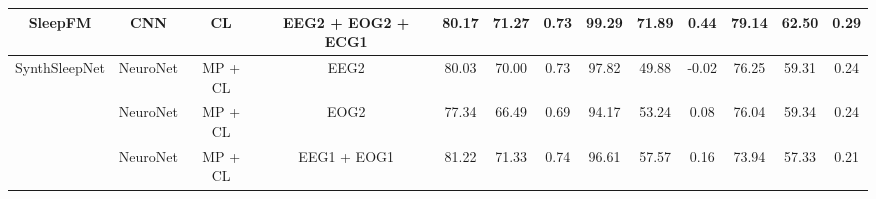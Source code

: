 \begin{table*}[!htbp]
{{\begin{tabular}{c|c|c|c|ccc|ccc|ccc}
SleepFM \cite{ref23}                                                                               & CNN                                                                                               & CL                                                                                                      & EEG2 + EOG2 + ECG1                  & 80.17          & 71.27          & 0.73                                                                     & 99.29          & 71.89          & 0.44                                                          & 79.14          & 62.50          & 0.29                                                              \\ 
\hline
\multirow{9}{*}{SynthSleepNet}                                                         & NeuroNet                                                                                          & MP
  + CL                                                                                               & EEG2                                & 80.03          & 70.00          & 0.73                                                                     & 97.82          & 49.88          & -0.02                                                         & 76.25          & 59.31          & 0.24                                                              \\
                                                                                       & NeuroNet                                                                                          & MP
  + CL                                                                                               & EOG2                                & 77.34          & 66.49          & 0.69                                                                     & 94.17          & 53.24          & 0.08                                                          & 76.04          & 59.34          & 0.24                                                              \\
                                                                                       & NeuroNet                                                                                          & MP
  + CL                                                                                               & EEG1 + EOG1                         & 81.22          & 71.33          & 0.74                                                                     & 96.61          & 57.57          & 0.16                                                          & 73.94          & 57.33          & 0.21                                                              \\

\end{tabular}}}
\end{table*}
